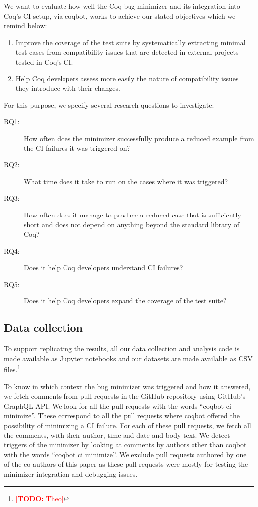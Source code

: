 \documentclass[a4paper,UKenglish,anonymous,cleveref,autoref,thm-restate]{lipics-v2021}
\makeatletter
\newcommand{\todo}[1]{%
\@latex@warning{TODO: \detokenize{#1} on page \thepage}%
\textcolor{red}{[\textbf{TODO:} #1]}}%
\makeatother
\begin{document}
We want to evaluate how well the Coq bug minimizer and its integration into Coq's CI setup, via coqbot, works to achieve our stated objectives which we remind below:

\begin{enumerate}
\item Improve the coverage of the test suite by systematically extracting minimal test cases from compatibility issues that are detected in external projects tested in Coq's CI.
\item Help Coq developers assess more easily the nature of compatibility issues they introduce with their changes.
\end{enumerate}

For this purpose, we specify several research questions to investigate:

\begin{description}
\item[RQ1:] How often does the minimizer successfully produce a reduced example from the CI failures it was triggered on?
\item[RQ2:] What time does it take to run on the cases where it was triggered?
\item[RQ3:] How often does it manage to produce a reduced case that is sufficiently short and does not depend on anything beyond the standard library of Coq?
\item[RQ4:] Does it help Coq developers understand CI failures?
\item[RQ5:] Does it help Coq developers expand the coverage of the test suite?
\end{description}

\subsection{Data collection}

To support replicating the results, all our data collection and analysis code is made available as Jupyter notebooks and our datasets are made available as CSV files.\footnote{\todo{Theo}}

To know in which context the bug minimizer was triggered and how it answered, we fetch comments from pull requests in the GitHub repository using GitHub's GraphQL API.
%
We look for all the pull requests with the words ``coqbot ci minimize''.
%
These correspond to all the pull requests where coqbot offered the possibility of minimizing a CI failure. For each of these pull requests, we fetch all the comments, with their author, time and date and body text.
%
We detect triggers of the minimizer by looking at comments by authors other than coqbot with the words ``coqbot ci minimize''.
%
We exclude pull requests authored by one of the co-authors of this paper as these pull requests were mostly for testing the minimizer integration and debugging issues.
\end{document}
